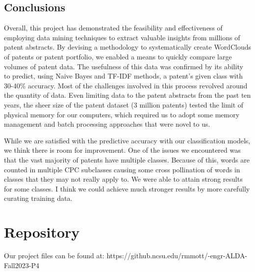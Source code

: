 \documentclass{article}
\begin{document}
\subsection{Conclusions}
Overall, this project has demonstrated the feasibility and effectiveness of employing data mining techniques to extract valuable insights from millions of patent abstracts.  By devising a methodology to systematically create WordClouds of patents or patent portfolio, we enabled a means to quickly compare large volumes of patent data.  The usefulness of this data was confirmed by its ability to predict, using Naive Bayes and TF-IDF methods, a patent’s given class with 30-40\% accuracy. Most of the challenges involved in this process revolved around the quantity of data.  Even limiting data to the patent abstracts from the past ten years, the sheer size of the patent dataset (3 million patents) tested the limit of physical memory for our computers, which required us to adopt some memory management and batch processing approaches that were novel to us.  

While we are satisfied with the predictive accuracy with our classification models, we think there is room for improvement. One of the issues we encountered was that the vast majority of patents have multiple classes.  Because of this, words are counted in multiple CPC subclasses causing some cross pollination of words in classes that they may not really apply to. We were able to attain strong results for some classes. I think we could achieve much stronger results by more carefully curating training data. 

\section{Repository}
Our project files can be found at: https://github.ncsu.edu/rmmott/-engr-ALDA-Fall2023-P4

 



\end{document}

